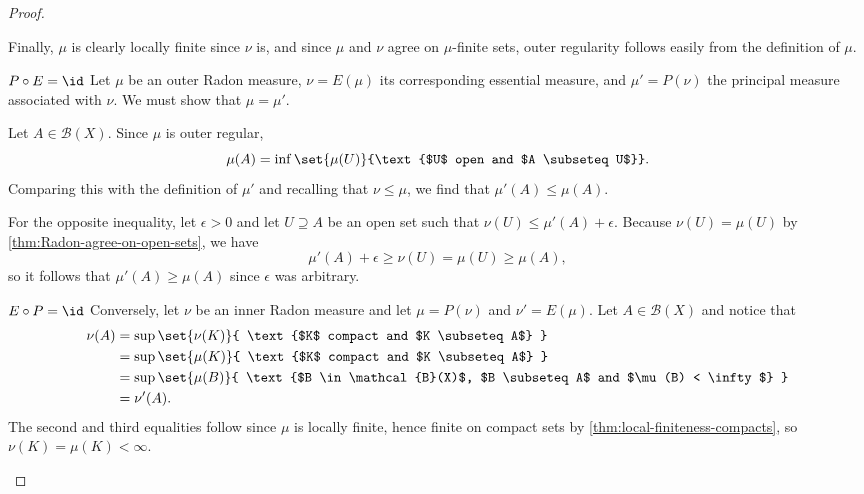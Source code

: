 \documentclass[article, a4paper, 11pt, oneside]{memoir}
\numberwithin{equation}{chapter}
\newcommand{\calB}{\mathcal{B}}
\newcommand{\borel}[1]{\calB(#1)}
\begin{document}
\begin{proof}
\begin{proofsec}
    Finally, $\mu$ is clearly locally finite since $\nu$ is, and since $\mu$ and $\nu$ agree on $\mu$-finite sets, outer regularity follows easily from the definition of $\mu$.

    \item[$P \circ E = \id$]
    Let $\mu$ be an outer Radon measure, $\nu = E(\mu)$ its corresponding essential measure, and $\mu' = P(\nu)$ the principal measure associated with $\nu$. We must show that $\mu = \mu'$.

    Let $A \in \borel{X}$. Since $\mu$ is outer regular,
    \begin{equation*}
        \mu(A)
            = \inf \set{\mu(U)}{\text{$U$ open and $A \subseteq U$}}.
    \end{equation*}
    Comparing this with the definition of $\mu'$ and recalling that $\nu \leq \mu$, we find that $\mu'(A) \leq \mu(A)$.

    For the opposite inequality, let $\epsilon > 0$ and let $U \supseteq A$ be an open set such that $\nu(U) \leq \mu'(A) + \epsilon$. Because $\nu(U) = \mu(U)$ by \cref{thm:Radon-agree-on-open-sets}, we have
    \begin{equation*}
        \mu'(A) + \epsilon
            \geq \nu(U)
            = \mu(U)
            \geq \mu(A),
    \end{equation*}
    so it follows that $\mu'(A) \geq \mu(A)$ since $\epsilon$ was arbitrary.

    \item[$E \circ P = \id$]
    Conversely, let $\nu$ be an inner Radon measure and let $\mu = P(\nu)$ and $\nu' = E(\mu)$. Let $A \in \borel{X}$ and notice that
    \begin{align*}
        \nu(A)
            &= \sup \set{\nu(K)}{ \text{$K$ compact and $K \subseteq A$} } \\
            &= \sup \set{\mu(K)}{ \text{$K$ compact and $K \subseteq A$} } \\
            &= \sup \set{\mu(B)}{ \text{$B \in \borel{X}$, $B \subseteq A$ and $\mu(B) < \infty$} } \\
            &= \nu'(A).
    \end{align*}
    The second and third equalities follow since $\mu$ is locally finite, hence finite on compact sets by \cref{thm:local-finiteness-compacts}, so $\nu(K) = \mu(K) < \infty$.
\end{proofsec}
\end{proof}
\end{document}
